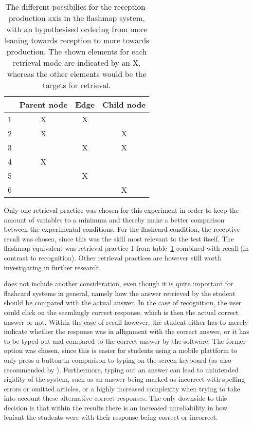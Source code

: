 \begin{table}[hb]
    \centering
    \begin{tabular}{lccc}
        \hline
         & Parent node & Edge & Child node \\
        \hline
        1 & X & X & \\
        2 & X & & X \\
        3 &  & X & X \\
        4 & X & & \\
        5 &  & X & \\
        6 &  & & X \\
        \hline
    \end{tabular}
    \caption{The different possibilies for the reception-production axis in the flashmap system, with an hypothesised ordering from more leaning towards reception to more towards production. The shown elements for each retrieval mode are indicated by an X, whereas the other elements would be the targets for retrieval.}
    \label{tab:retrievalmaps}
\end{table}

Only one retrieval practice was chosen for this experiment in order to keep the amount of variables to a minimum and thereby make a better comparison between the experimental conditions. For the flashcard condition, the receptive recall was chosen, since this was the skill most relevant to the test itself. The flashmap equivalent was retrieval practice 1 from table~\ref{tab:retrievalmaps} combined with recall (in contrast to recognition). Other retrieval practices are however still worth investigating in further research.

 does not include another consideration, even though it is quite important for flashcard systems in general, namely how the answer retrieved by the student should be compared with the actual answer. In the case of recognition, the user could click on the seemlingly correct response, which is then the actual correct answer or not. Within the case of recall however, the student either has to merely indicate whether the response was in allignment with the correct answer, or it has to be typed out and compared to the correct answer by the software. The former option was chosen, since this is easier for students using a mobile plattform to only press a button in comparison to typing on the screen keyboard (as also recommended by ). Furthermore, typing out an answer can lead to unintended rigidity of the system, such as an answer being marked as incorrect with spelling errors or omitted articles, or a highly increased complexity when trying to take into account these alternative correct responses. The only downside to this decision is that within the results there is an increased unreliability in how leniant the students were with their response being correct or incorrect.

